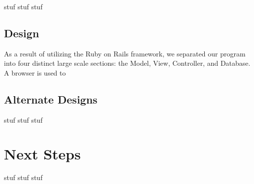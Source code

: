 \documentclass[11pt]{article}
\begin{document}
stuf stuf stuf

\subsection{Design}

As a result of utilizing the Ruby on Rails framework, we separated our program into four distinct large scale sections: the Model, View, Controller, and Database.  A browser is used to 

\subsection{Alternate Designs}

stuf stuf stuf

\section{Next Steps}

stuf stuf stuf
\end{document}
